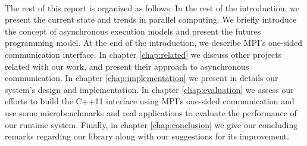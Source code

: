 \paragraph{}
The rest of this report is organized as follows:  In the rest of the introduction, we present the current state
and trends in parallel computing.  We briefly introduce the concept of asynchronous execution models and present
the futures programming model.  At the end of the introduction, we describe MPI's one-sided communication interface.
In chapter \ref{chap:related} we discuss other projects related with our work, and present their approach to
asynchronous communication.  In chapter \ref{chap:implementation} we present in details our system's design and 
implementation.  In chapter \ref{chap:evaluation} we assess our efforts to build the C++11 interface using 
MPI's one-sided communication and use some microbenchmarks and real applications to evaluate the performance
of our runtime system.  Finally, in chapter \ref{chap:conclusion} we give our concluding remarks regarding our
library along with our suggestions for its improvement.    

